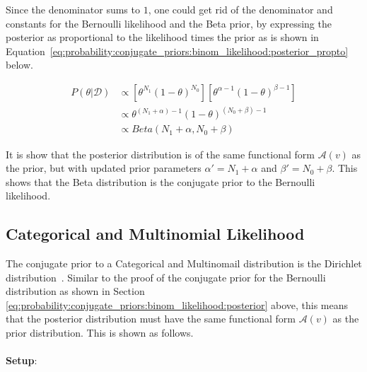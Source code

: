 Since the denominator sums to $1$, one could get rid of the denominator and constants for the Bernoulli likelihood and the Beta prior, by expressing the posterior as proportional to the likelihood times the prior as is shown in Equation~\eqref{eq:probability:conjugate_priors:binom_likelihood:posterior_propto} below.

\begin{equation}
      \label{eq:probability:conjugate_priors:binom_likelihood:posterior_propto}
      \begin{split}
            P(\theta | \mathcal{D}) &\propto \left[\theta^{N_{1}}(1-\theta)^{N_{0}}\right] \left[\theta^{\alpha - 1} (1 - \theta)^{\beta - 1}\right] \\
            &\propto \theta^{(N_{1} + \alpha) - 1}(1-\theta)^{(N_{0} + \beta) - 1} \\
            &\propto Beta(N_{1} + \alpha, N_{0} + \beta)
      \end{split}
\end{equation}

It is show that the posterior distribution is of the same functional form $\mathcal{A}(v)$ as the prior, but with updated prior parameters $\alpha' = N_{1} + \alpha$ and $\beta' = N_{0} + \beta$. This shows that the Beta distribution is the conjugate prior to the Bernoulli likelihood.


\subsection{Categorical and Multinomial Likelihood}
\label{sec:probability:conjugate_priors:cat_mult_likelihood}

The conjugate prior to a Categorical and Multinomail distribution is the Dirichlet distribution~\cite{ref:wackerly:2014}. Similar to the proof of the conjugate prior for the Bernoulli distribution as shown in Section \ref{eq:probability:conjugate_priors:binom_likelihood:posterior} above, this means that the posterior distribution must have the same functional form $\mathcal{A}(v)$ as the prior distribution. This is shown as follows. \\\\
\textbf{Setup}:

